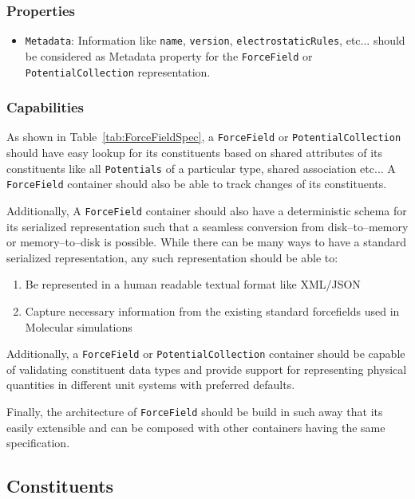 \documentclass[12pt]{article}
\begin{document}
\subsubsection{Properties}
\begin{itemize}
    \item \texttt{Metadata}: Information like \texttt{name}, \texttt{version}, \texttt{electrostaticRules}, etc...  should be considered as Metadata property for the \texttt{ForceField} or \texttt{PotentialCollection} representation.
\end{itemize}

\subsubsection{Capabilities}
As shown in Table~\ref{tab:ForceFieldSpec}, a \texttt{ForceField} or \texttt{PotentialCollection} should have easy lookup for its constituents based on shared attributes of its constituents like all \texttt{Potentials} of a particular type, shared association etc... A \texttt{ForceField} container should also be able to track changes of its constituents.

Additionally, A \texttt{ForceField} container should also have a deterministic schema for  its  serialized  representation  such  that  a  seamless  conversion  from  disk–to–memory  or memory–to–disk is possible. While there can be many ways to have a standard serialized representation, any such representation should be able to:

\begin{enumerate}
    \item Be represented in a human readable textual format like XML/JSON
    \item Capture necessary information from the existing standard forcefields used in Molecular simulations
\end{enumerate}

Additionally, a \texttt{ForceField} or \texttt{PotentialCollection} container should be capable of validating constituent data types and provide support for representing physical quantities in different unit systems with preferred defaults.

Finally, the architecture of \texttt{ForceField} should be build in such away that its easily extensible and can be composed with other containers having the same specification.

\subsection{Constituents}
\pagebreak
\end{document}
